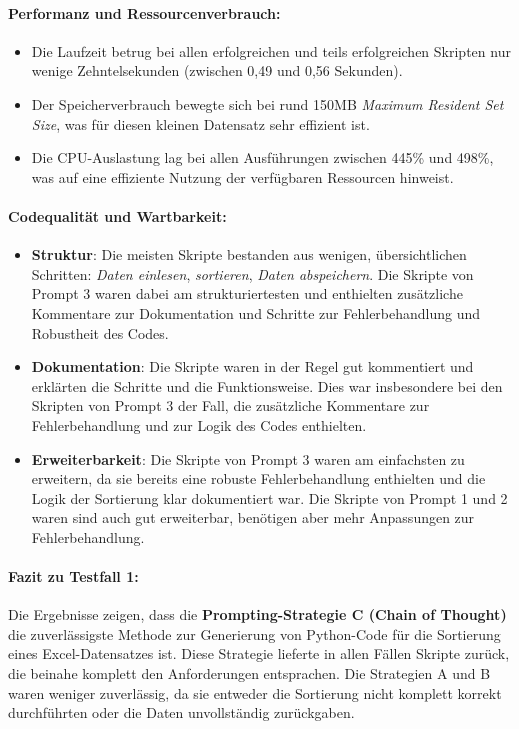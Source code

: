 \documentclass[11pt,a4paper]{article}
\begin{document}
\paragraph{Performanz und Ressourcenverbrauch:}
\begin{itemize}
    \item Die Laufzeit betrug bei allen erfolgreichen und teils erfolgreichen Skripten nur wenige Zehntelsekunden (zwischen 0,49 und 0,56 Sekunden).
    \item Der Speicherverbrauch bewegte sich bei rund 150MB \emph{Maximum Resident Set Size}, was für diesen kleinen Datensatz sehr effizient ist.
    \item Die CPU-Auslastung lag bei allen Ausführungen zwischen 445\% und 498\%, was auf eine effiziente Nutzung der verfügbaren Ressourcen hinweist.
\end{itemize}
    
\paragraph{Codequalität und Wartbarkeit:}
\begin{itemize}
    \item \textbf{Struktur}: Die meisten Skripte bestanden aus wenigen, übersichtlichen Schritten: \emph{Daten einlesen}, \emph{sortieren}, \emph{Daten abspeichern}. Die Skripte von Prompt 3 waren dabei am strukturiertesten und enthielten zusätzliche Kommentare zur Dokumentation und Schritte zur Fehlerbehandlung und Robustheit des Codes.
    \item \textbf{Dokumentation}: Die Skripte waren in der Regel gut kommentiert und erklärten die Schritte und die Funktionsweise. Dies war insbesondere bei den Skripten von Prompt 3 der Fall, die zusätzliche Kommentare zur Fehlerbehandlung und zur Logik des Codes enthielten.
    \item \textbf{Erweiterbarkeit}: Die Skripte von Prompt 3 waren am einfachsten zu erweitern, da sie bereits eine robuste Fehlerbehandlung enthielten und die Logik der Sortierung klar dokumentiert war. Die Skripte von Prompt 1 und 2 waren sind auch gut erweiterbar, benötigen aber mehr Anpassungen zur Fehlerbehandlung.
\end{itemize}
    
\paragraph{Fazit zu Testfall 1:}
Die Ergebnisse zeigen, dass die \textbf{Prompting-Strategie C (Chain of Thought)} die zuverlässigste Methode zur Generierung von Python-Code für die Sortierung eines Excel-Datensatzes ist. Diese Strategie lieferte in allen Fällen Skripte zurück, die beinahe komplett den Anforderungen entsprachen. Die Strategien A und B waren weniger zuverlässig, da sie entweder die Sortierung nicht komplett korrekt durchführten oder die Daten unvollständig zurückgaben.
\end{document}
